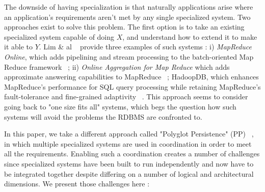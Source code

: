 The downside of having specialization is that naturally applications arise where an application's requirements aren't met by any single specialized system. Two approaches exist to solve this problem. The first option is to take an existing specialized system capable of doing $X$, and understand how to extend it to make it able to $Y$. Lim \& al ~\cite{Lim2013} provide three examples of such systems : i) \emph{MapReduce Online}, which adds pipelining and stream processing to the batch-oriented Map Reduce framework ~\cite{Condie2010}; ii) \emph{Online Aggregation for Map Reduce} which adds approximate answering capabilities to MapReduce ~\cite{Pansare2011}; HadoopDB, which enhances MapReduce's performance for SQL query processing while retaining MapReduce's fault-tolerance and fine-grained adaptivity ~\cite{Abouzeid2009}. This approach seems to consider going back to "one size fits all" systems, which begs the question how such systems will avoid the problems the RDBMS are confronted to.

In this paper, we take a different approach called "Polyglot Persistence" (PP) ~\cite{Fowler2012},  in which multiple specialized systems are used in coordination in order to meet all the requirements. Enabling such a coordination creates a number of challenges since specialized systems have been built to run independently and now have to be integrated together despite differing on a number of logical and architectural dimensions. We present those challenges here :

